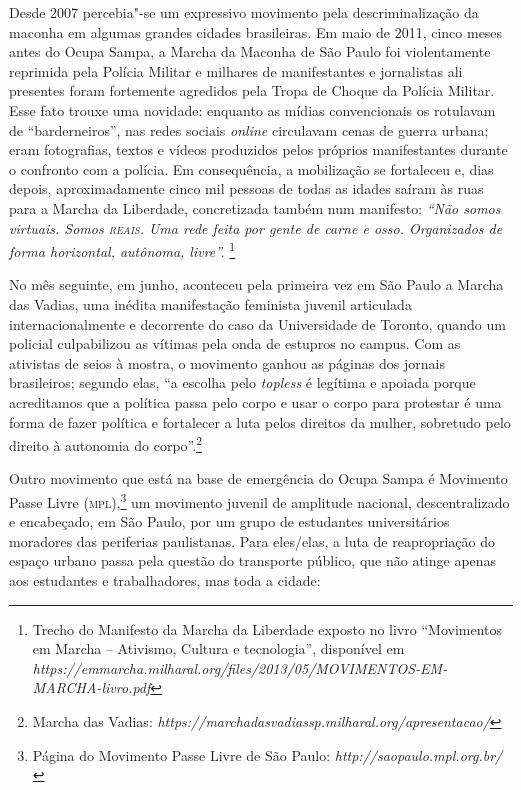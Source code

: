 Desde 2007 percebia"-se um expressivo movimento pela descriminalização da
maconha em algumas grandes cidades brasileiras. Em maio de 2011, cinco
meses antes do Ocupa Sampa, a Marcha da Maconha de São Paulo foi
violentamente reprimida pela Polícia Militar e milhares de manifestantes
e jornalistas ali presentes foram fortemente agredidos pela Tropa de
Choque da Polícia Militar. Esse fato trouxe uma novidade: enquanto as
mídias convencionais os rotulavam de ``barderneiros'', nas redes sociais
\emph{online} circulavam cenas de guerra urbana; eram fotografias,
textos e vídeos produzidos pelos próprios manifestantes durante o
confronto com a polícia. Em consequência, a mobilização se fortaleceu e,
dias depois, aproximadamente cinco mil pessoas de todas as idades saíram
às ruas para a Marcha da Liberdade, concretizada também num manifesto:
\emph{``Não somos virtuais. Somos \textsc{reais}. Uma rede feita por gente de
carne e osso. Organizados de forma horizontal, autônoma, livre''.}
\footnote{Trecho do Manifesto da Marcha da Liberdade exposto no livro
  ``Movimentos em Marcha -- Ativismo, Cultura e tecnologia'', disponível
  em
  \emph{https://emmarcha.milharal.org/files/2013/05/MOVIMENTOS-EM-MARCHA-livro.pdf}}

No mês seguinte, em junho, aconteceu pela primeira vez em São Paulo a
Marcha das Vadias, uma inédita manifestação feminista juvenil articulada
internacionalmente e decorrente do caso da Universidade de Toronto,
quando um policial culpabilizou as vítimas pela onda de estupros no
campus. Com as ativistas de seios à mostra, o movimento ganhou as
páginas dos jornais brasileiros; segundo elas, ``a escolha pelo
\emph{topless} é legítima e apoiada porque acreditamos que a política
passa pelo corpo e usar o corpo para protestar é uma forma de fazer
política e fortalecer a luta pelos direitos da mulher, sobretudo pelo
direito à autonomia do corpo''.\footnote{Marcha das Vadias:
  \emph{https://marchadasvadiassp.milharal.org/apresentacao/}}

Outro movimento que está na base de emergência do Ocupa Sampa é
Movimento Passe Livre (\textsc{mpl}),\footnote{Página do Movimento Passe Livre de
  São Paulo: \emph{http://saopaulo.mpl.org.br/}} um movimento juvenil de
amplitude nacional, descentralizado e encabeçado, em São Paulo, por um
grupo de estudantes universitários moradores das periferias
paulistanas. Para eles/elas, a luta de reapropriação do espaço urbano
passa pela questão do transporte público, que não atinge apenas aos
estudantes e trabalhadores, mas toda a cidade:


